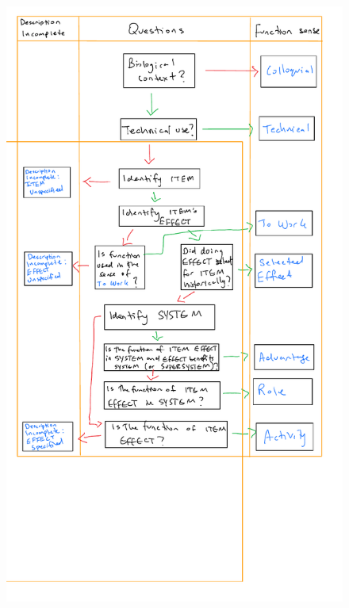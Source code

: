 \documentclass{article}
\begin{document}
\begin{figure}[ht]
  \centering
  \includegraphics[width=\linewidth]{GeneralFlowchart.pdf}
  \caption[\textbf{Decision flowchart for identifying sense of function.}]{}
  \label{flowchart}
\end{figure}
\end{document}
